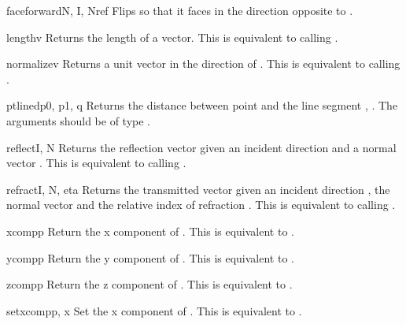 \begin{funcdesc}{faceforward}{N, I, Nref}
Flips  so that it faces in the direction opposite to . 

\end{funcdesc}

\begin{funcdesc}{length}{v}
Returns the length of a vector. This is equivalent to calling 
.
\end{funcdesc}

\begin{funcdesc}{normalize}{v}
Returns a unit vector in the direction of . This is equivalent to
calling .
\end{funcdesc}

\begin{funcdesc}{ptlined}{p0, p1, q}
Returns the distance between point  and the line segment ,
. The arguments should be of type .
\end{funcdesc}

\begin{funcdesc}{reflect}{I, N}
Returns the reflection vector given an incident direction  and a
normal vector . This is equivalent to calling .
\end{funcdesc}

\begin{funcdesc}{refract}{I, N, eta}
Returns the transmitted vector given an incident direction ,
the normal vector  and the relative index of refraction
. This is equivalent to calling .
\end{funcdesc}

\begin{funcdesc}{xcomp}{p}
Return the x component of . This is equivalent to .
\end{funcdesc}

\begin{funcdesc}{ycomp}{p}
Return the y component of . This is equivalent to .
\end{funcdesc}

\begin{funcdesc}{zcomp}{p}
Return the z component of . This is equivalent to .
\end{funcdesc}

\begin{funcdesc}{setxcomp}{p, x}
Set the x component of . This is equivalent to .
\end{funcdesc}

